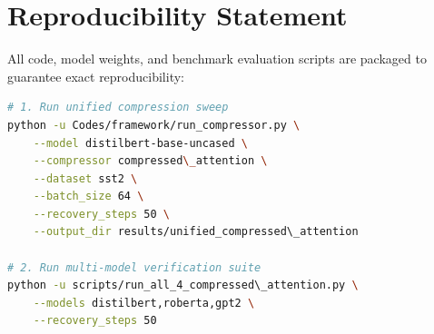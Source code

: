 \section{Reproducibility Statement}
All code, model weights, and benchmark evaluation scripts are packaged to guarantee exact reproducibility:
\begin{lstlisting}[language=bash]
# 1. Run unified compression sweep
python -u Codes/framework/run_compressor.py \
    --model distilbert-base-uncased \
    --compressor compressed\_attention \
    --dataset sst2 \
    --batch_size 64 \
    --recovery_steps 50 \
    --output_dir results/unified_compressed\_attention

# 2. Run multi-model verification suite
python -u scripts/run_all_4_compressed\_attention.py \
    --models distilbert,roberta,gpt2 \
    --recovery_steps 50
\end{lstlisting}
